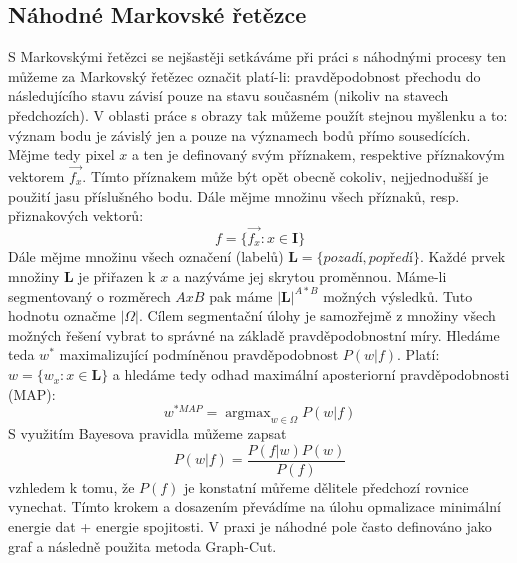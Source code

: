 \documentclass{thesis}%
\DeclareMathOperator*{\argmax}{argmax}
\begin{document}
\subsection{Náhodné Markovské řetězce}
S Markovskými řetězci se nejšastěji setkáváme při práci s náhodnými procesy ten můžeme za Markovský řetězec označit platí-li: pravděpodobnost přechodu do následujícího stavu závisí pouze na stavu současném (nikoliv na stavech předchozích). V oblasti práce s obrazy tak můžeme použít stejnou myšlenku a to: význam bodu je závislý jen a pouze na významech bodů přímo sousedících. Mějme tedy pixel $x$ a ten je definovaný svým příznakem, respektive příznakovým vektorem $\overrightarrow{f_x}$. Tímto příznakem může být opět obecně cokoliv, nejjednodušší je použití jasu příslušného bodu. Dále mějme množinu všech příznaků, resp. přiznakových vektorů:
\begin{equation}
f = \{\overrightarrow{f_x} : x \in \mathbf{I}\}
\end{equation}
Dále mějme množinu všech označení (labelů) $\mathbf{L} = \{ pozadí, popředí\}$. Každé prvek množiny $\mathbf{L}$ je přiřazen k $x$ a nazýváme jej skrytou proměnnou. Máme-li segmentovaný o rozměrech $AxB$ pak máme $|\mathbf{L}|^{A*B}$ možných výsledků. Tuto hodnotu označme $|\Omega|$. Cílem segmentační úlohy je samozřejmě z množiny všech možných řešení vybrat to správné na základě pravděpodobnostní míry. Hledáme teda $w^*$ maximalizující podmíněnou pravděpodobnost $P(w|f)$. Platí: $w=\{ w_x : x \in \mathbf{L}\}$ a hledáme tedy odhad maximální aposteriorní pravděpodobnosti (MAP):
\begin{equation}
w^{*MAP} = \argmax_{w\in \Omega}P(w|f)
\end{equation}
S využitím Bayesova pravidla můžeme zapsat
\begin{equation}
P(w|f) = \frac{P(f|w)P(w)}{P(f)}
\end{equation}
vzhledem k tomu, že $P(f)$ je konstatní můřeme dělitele předchozí rovnice vynechat. Tímto krokem a dosazením převádíme na úlohu opmalizace minimální energie dat + energie spojitosti. V praxi je náhodné pole často definováno jako graf a následně použita metoda Graph-Cut.
\end{document}
